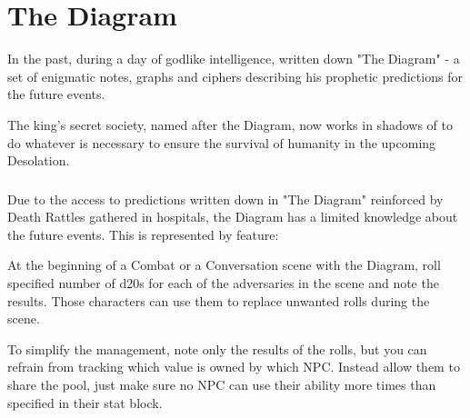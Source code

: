 \section{The Diagram}
\label{enemyFractionDiagram}

In the past, during a day of godlike intelligence, \npcTaravangian{} written down "The Diagram" - a set of enigmatic notes, graphs and ciphers describing his prophetic predictions for the future events. 

The king's secret society, named after the Diagram, now works in shadows of \locationKharbranth{} to do whatever is necessary to ensure the survival of humanity in the upcoming Desolation.



\subsubsection{\abilityFutureKnowledgeName{}}

Due to the access to predictions written down in "The Diagram" reinforced by Death Rattles gathered in \locationKharbranth{} hospitals, the Diagram has a limited knowledge about the future events. This is represented by \abilityFutureKnowledgeName{} feature:

\abilityFutureKnowledge{}

At the beginning of a Combat or a Conversation scene with the Diagram, roll specified number of d20s for each of the adversaries in the scene and note the results. Those characters can use them to replace unwanted rolls during the scene.

To simplify the management, note only the results of the rolls, but you can refrain from tracking which value is owned by which NPC. Instead allow them to share the pool, just make sure no NPC can use their ability more times than specified in their stat block.



\newpage

\newpage

\newpage

\newpage

\newpage
~~ \newpage

